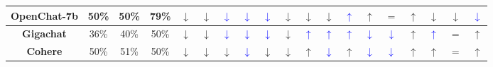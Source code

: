 \documentclass{article}
\newcommand{\bluearrow}[1]{\textcolor{blue}{#1}}
\begin{document}
\begin{table}[!ht]
{\begin{tabular}{c|cc|c|ccc|ccc|ccc|ccc|ccc}
\hline
\textbf{OpenChat-7b} & 50\% & 50\%  & 79\% & $\downarrow$ & $\downarrow$ & \bluearrow{$\downarrow$} & \bluearrow{$\downarrow$} & \bluearrow{$\downarrow$} & $\downarrow$ & $\downarrow$ & $\downarrow$ & \bluearrow{$\uparrow$} & $\uparrow$  & $=$ & $\uparrow$ & $\downarrow$ & $\downarrow$ & \bluearrow{$\downarrow$} \\
\hline
\textbf{Gigachat} & 36\% & 40\%  & 50\% & $\downarrow$ & $\downarrow$ & \bluearrow{$\downarrow$} & \bluearrow{$\downarrow$} & \bluearrow{$\downarrow$} & $\downarrow$ & \bluearrow{$\uparrow$} & \bluearrow{$\uparrow$} & \bluearrow{$\uparrow$} & \bluearrow{$\downarrow$} & \bluearrow{$\downarrow$} & $\uparrow$ & \bluearrow{$\uparrow$} & $=$ & $\uparrow $  \\

\textbf{Cohere} & 50\% & 51\%  & 50\% & $\downarrow$ & $\downarrow$ & $\downarrow$ & \textcolor{blue}{$\downarrow$} & $\downarrow$ & $\downarrow$ & $\uparrow$ & \textcolor{blue}{$\downarrow$}& $\uparrow$ & \bluearrow{$\downarrow$} & $ \textcolor{blue}{\downarrow}$ & $\uparrow$ & $\uparrow$ & $=$ & $\uparrow $  \\
\hline


\end{tabular}}
\end{table}
\end{document}
